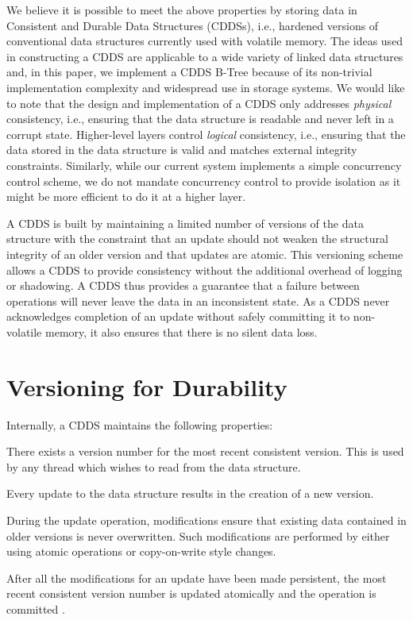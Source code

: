 We believe it is possible to meet the above properties by storing data
in Consistent and Durable Data Structures (CDDSs), i.e., hardened
versions of conventional data structures currently used with volatile
memory.  The ideas used in constructing a CDDS are applicable to a
wide variety of linked data structures and, in this paper, we
implement a CDDS B-Tree because of its non-trivial implementation
complexity and widespread use in storage systems.  We would like to
note that the design and implementation of a CDDS only addresses
\textit{physical} consistency, i.e., ensuring that the data structure
is readable and never left in a corrupt state.  Higher-level layers
control \textit{logical} consistency, i.e., ensuring that the data
stored in the data structure is valid and matches external integrity
constraints.  Similarly, while our current system implements a simple
concurrency control scheme, we do not mandate concurrency control to
provide isolation as it might be more efficient to do it at a higher
layer.

A CDDS is built by maintaining a limited number of versions of the
data structure with the constraint that an update should not weaken
the structural integrity of an older version and that updates are
atomic.  This versioning scheme allows a CDDS to provide consistency
without the additional overhead of logging or shadowing.  A CDDS thus
provides a guarantee that a failure between operations will never
leave the data in an inconsistent state.  As a CDDS never acknowledges
completion of an update without safely committing it to non-volatile
memory, it also ensures that there is no silent data loss.



\section{Versioning for Durability}
\label{sec:versioning_overview}

Internally, a CDDS maintains the following properties:

\begin{smitemize}
  \item There exists a version number for the most recent consistent
    version.  This is used by any thread which wishes to read from the
    data structure.
  \item Every update to the data structure results in the creation of
    a new version.
  \item During the update operation, modifications ensure that existing 
    data contained in older versions is never overwritten. Such
    modifications are performed by either using atomic operations
    or copy-on-write style changes.
  \item After all the modifications for an update have been made
    persistent, the most recent consistent version number is updated
    atomically and the operation is committed .
\end{smitemize}


